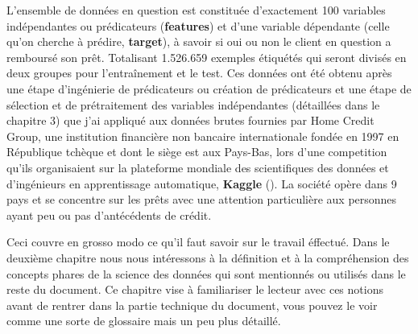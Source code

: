 L'ensemble de données en question est constituée d'exactement 100 variables indépendantes ou prédicateurs (\textbf{features}) et d'une variable dépendante (celle qu'on cherche à prédire, \textbf{target}), à savoir si oui ou non le client en question a remboursé son prêt. Totalisant 1.526.659 exemples étiquétés qui seront divisés en deux groupes pour l'entraînement et le test. Ces données ont été obtenu après une étape d'ingénierie de prédicateurs ou création de prédicateurs et une étape de sélection et de prétraitement des variables indépendantes (détaillées dans le chapitre 3) que j'ai appliqué aux données brutes fournies par Home Credit Group, une institution financière non bancaire internationale fondée en 1997 en République tchèque et dont le siège est aux Pays-Bas, lors d'une competition qu'ils organisaient sur la plateforme mondiale des scientifiques des données et d'ingénieurs en apprentissage automatique, \textbf{Kaggle} (\cite{herman2024home}). La société opère dans 9 pays et se concentre sur les prêts avec une attention particulière aux personnes ayant peu ou pas d'antécédents de crédit.

Ceci couvre en grosso modo ce qu'il faut savoir sur le travail éffectué. Dans le deuxième chapitre nous nous intéressons à la définition et à la compréhension des concepts phares de la science des données qui sont mentionnés ou utilisés dans le reste du document. Ce chapitre vise à familiariser le lecteur avec ces notions avant de rentrer dans la partie technique du document, vous pouvez le voir comme une sorte de glossaire mais un peu plus détaillé.